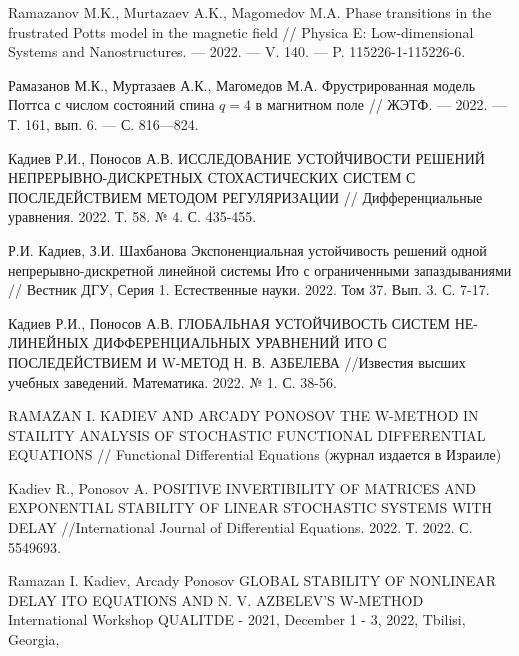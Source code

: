 \begin{thebibliography}{111}
  Ramazanov M.K., Murtazaev A.K., Magomedov M.A.
  Phase transitions in the frustrated Potts model in the magnetic field
  //
  Physica E: Low-dimensional Systems and Nanostructures.
  --- 2022.
  --- V. 140.
  --- P. 115226-1-115226-6.

  Рамазанов М.К., Муртазаев А.К., Магомедов М.А.
  Фрустрированная модель Поттса с числом состояний спина $q = 4$ в магнитном поле
  //
  ЖЭТФ.
  --- 2022.
  --- Т. 161, вып. 6.
  --- С. 816---824.
  
   Кадиев Р.И., Поносов А.В. ИССЛЕДОВАНИЕ УСТОЙЧИВОСТИ РЕШЕНИЙ
НЕПРЕРЫВНО-ДИСКРЕТНЫХ СТОХАСТИЧЕСКИХ СИСТЕМ С ПОСЛЕДЕЙСТВИЕМ МЕТОДОМ
РЕГУЛЯРИЗАЦИИ // Дифференциальные уравнения. 2022. Т. 58. № 4. С.
435-455.

 Р.И. Кадиев, З.И. Шахбанова Экспоненциальная устойчивость решений
одной непрерывно-дискретной линейной системы Ито с ограниченными
запаздываниями // Вестник ДГУ, Серия 1. Естественные науки. 2022.
Том 37. Вып. 3. С. 7-17.

 Кадиев Р.И., Поносов А.В. ГЛОБАЛЬНАЯ УСТОЙЧИВОСТЬ СИСТЕМ
НЕ-ЛИНЕЙНЫХ ДИФФЕРЕНЦИАЛЬНЫХ УРАВНЕНИЙ ИТО С ПОСЛЕДЕЙСТВИЕМ И
W-МЕТОД Н. В. АЗБЕЛЕВА //Известия высших учебных заведений.
Математика. 2022. № 1. С. 38-56.

 RAMAZAN I. KADIEV AND ARCADY PONOSOV THE W-METHOD IN STAILITY
ANALYSIS OF STOCHASTIC FUNCTIONAL DIFFERENTIAL EQUATIONS //
Functional Differential Equations (журнал издается в Израиле)

 Kadiev R., Ponosov A. POSITIVE INVERTIBILITY OF MATRICES AND
EXPONENTIAL STABILITY OF LINEAR STOCHASTIC SYSTEMS WITH DELAY
//International Journal of Differential Equations. 2022. Т. 2022. С.
5549693.

 Ramazan I. Kadiev, Arcady Ponosov GLOBAL STABILITY OF
NONLINEAR DELAY  ITO EQUATIONS AND N. V. AZBELEV'S W-METHOD \\
International Workshop QUALITDE - 2021, December 1 - 3, 2022,
Tbilisi, Georgia,

\end{thebibliography} 